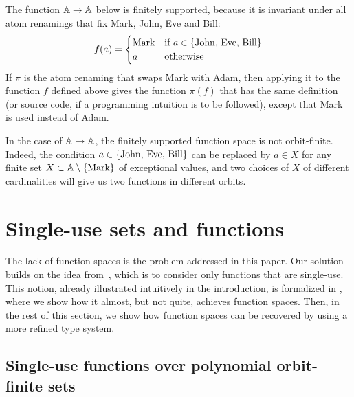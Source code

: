 \documentclass[a4paper,UKenglish,cleveref, autoref, numberwithinsect, thm-restate]{lipics-v2021}
\begin{document}
\begin{example}\label{ex:atoms-to-atoms}
    The function $\mathbb A\to\mathbb A$ below is finitely supported, because it is invariant under all atom renamings that fix Mark, John, Eve and Bill:
    \begin{align*}
    f(a) = \begin{cases}
        \text{Mark} & \text{if $a \in \{\text{John, Eve, Bill}\}$} \\
        a & \text{otherwise}
    \end{cases}
    \end{align*}
    If $\pi$ is the atom renaming that swaps Mark with Adam, then applying it to the function $f$ defined above gives the function $\pi(f)$ that has the same definition (or source code, if a programming intuition is to be followed), except that Mark is used instead of Adam.

    In the case of $\mathbb A \to \mathbb A$, the finitely supported function space is not orbit-finite. Indeed, the condition $a \in \{\text{John, Eve, Bill}\}$ can be replaced by $a \in X$ for any finite set $X \subset \mathbb A\setminus\{\text{Mark}\}$ of exceptional values, and two choices of $X$ of different cardinalities will give us two functions in different orbits. \exampleend
\end{example}


\section{Single-use sets and functions}
\label{sec:single-use-sets}
The lack of function spaces is the problem addressed in this paper.
 Our solution builds on the idea from~\cite[Section 2.2]{stefanski-phd}, which is to consider only functions that are single-use. This notion, already illustrated intuitively in the introduction, is formalized in , where we show how it almost, but not quite, achieves function spaces. Then, in the rest of this section, we show how function spaces can be recovered by using a more refined type system. 

\subsection{Single-use functions over polynomial orbit-finite sets}
\label{sec:single-use-functions-over-polynomial-orbit-finite-sets}
\end{document}
